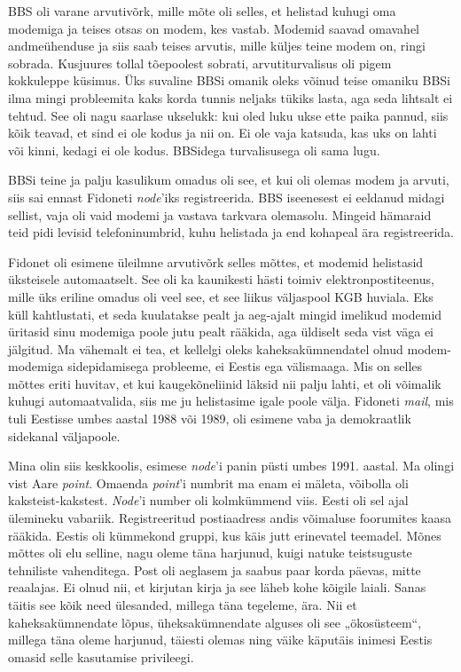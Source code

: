 
BBS oli varane arvutivõrk, mille mõte oli selles, et helistad 
kuhugi oma modemiga ja teises otsas on modem, kes vastab. Modemid saavad 
omavahel andmeühenduse ja siis saab teises arvutis, mille 
küljes teine modem on, ringi sobrada. Kusjuures tollal tõepoolest
sobrati, arvutiturvalisus oli pigem kokkuleppe 
küsimus. Üks suvaline BBSi omanik oleks võinud teise 
omaniku BBSi ilma mingi 
probleemita kaks korda tunnis neljaks tükiks lasta, aga seda lihtsalt ei 
tehtud. See oli nagu 
saarlase ukselukk: kui oled luku ukse ette paika pannud, siis kõik 
teavad, et sind ei ole kodus ja nii on. Ei ole vaja katsuda, kas uks 
on lahti või kinni, kedagi ei ole kodus. BBSidega turvalisusega oli sama lugu. 

BBSi teine ja palju kasulikum omadus oli see, et kui 
oli olemas modem ja arvuti, siis sai ennast Fidoneti 
\emph{node}'iks registreerida. BBS iseenesest ei eeldanud midagi sellist, vaja 
oli vaid
modemi ja vastava tarkvara olemasolu. Mingeid hämaraid teid pidi levisid 
telefoninumbrid, kuhu helistada ja end kohapeal ära registreerida.

Fidonet oli esimene üleilmne arvutivõrk selles 
mõttes, et modemid helistasid üksteisele automaatselt. See oli ka kaunikesti 
hästi toimiv elektronpostiteenus, mille üks eriline omadus 
oli veel see, et see liikus väljaspool KGB huviala. Eks küll 
kahtlustati, et seda kuulatakse pealt ja aeg-ajalt mingid imelikud modemid 
üritasid sinu modemiga poole jutu pealt rääkida, aga üldiselt seda vist väga ei 
jälgitud. Ma vähemalt ei tea, et kellelgi oleks 
kaheksakümnendatel olnud modem-modemiga sidepidamisega probleeme, ei Eestis ega 
välismaaga. Mis on selles mõttes eriti huvitav, et kui kaugekõneliinid läksid 
nii palju lahti, et oli võimalik kuhugi automaatvalida, siis me ju helistasime 
igale poole välja.  
Fidoneti \emph{mail}, mis tuli Eestisse umbes aastal 1988 või 1989, oli esimene 
vaba ja 
demokraatlik sidekanal väljapoole.

Mina olin siis keskkoolis, esimese \emph{node}'i panin püsti umbes 1991. 
aastal. Ma olingi vist Aare \emph{point}. 
Omaenda \emph{point}'i numbrit ma enam ei mäleta, võibolla oli 
kaksteist-kakstest. \emph{Node}'i number oli
kolmkümmend viis. Eesti oli sel ajal ülemineku vabariik. 
Registreeritud postiaadress andis võimaluse foorumites 
kaasa rääkida. Eestis oli kümmekond gruppi, kus käis jutt erinevatel 
teemadel. Mõnes mõttes oli elu selline, nagu oleme täna 
harjunud, kuigi natuke teistsuguste tehniliste vahenditega. Post oli aeglasem 
ja 
saabus paar korda 
päevas, mitte reaalajas. Ei olnud nii, et kirjutan kirja ja see läheb kohe 
kõigile laiali. Sanas täitis see kõik need ülesanded, millega täna tegeleme, 
ära. Nii et kaheksakümnendate lõpus, üheksakümnendate alguses oli see 
„ökosüsteem“, millega täna oleme harjunud, täiesti olemas ning 
väike käputäis inimesi Eestis omasid selle kasutamise privileegi. 

